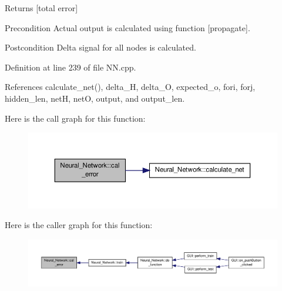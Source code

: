 \begin{DoxyReturn}{Returns}
\mbox{[}total error\mbox{]} 
\end{DoxyReturn}
\begin{DoxyPrecond}{Precondition}
Actual output is calculated using function \mbox{[}propagate\mbox{]}. 
\end{DoxyPrecond}
\begin{DoxyPostcond}{Postcondition}
Delta signal for all nodes is calculated. 
\end{DoxyPostcond}


Definition at line 239 of file N\-N.\-cpp.



References calculate\-\_\-net(), delta\-\_\-\-H, delta\-\_\-\-O, expected\-\_\-o, fori, forj, hidden\-\_\-len, net\-H, net\-O, output, and output\-\_\-len.



Here is the call graph for this function\-:\nopagebreak
\begin{figure}[H]
\begin{center}
\leavevmode
\includegraphics[width=350pt]{d1/d7c/a00003_a3e503ddab5bbc51f6e0b79b67ca6ed2f_cgraph}
\end{center}
\end{figure}




Here is the caller graph for this function\-:
\nopagebreak
\begin{figure}[H]
\begin{center}
\leavevmode
\includegraphics[width=350pt]{d1/d7c/a00003_a3e503ddab5bbc51f6e0b79b67ca6ed2f_icgraph}
\end{center}
\end{figure}


